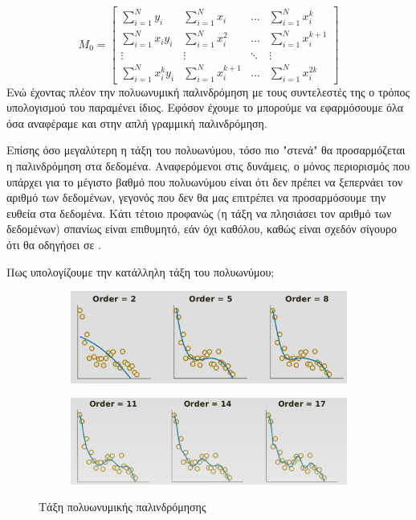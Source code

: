 \\
$$
M_0=
\begin{bmatrix}
    \sum\limits_{i=1}^Ny_i          & \sum\limits_{i=1}^Nx_i        & \dots     & \sum\limits_{i=1}^Nx_i^k \\
    \sum\limits_{i=1}^Nx_iy_i          & \sum\limits_{i=1}^Nx_i^2      & \dots     & \sum\limits_{i=1}^Nx_i^{k+1} \\
    \vdots                          & \vdots                        & \ddots    & \vdots \\
    \sum\limits_{i=1}^Nx_i^ky_i        & \sum\limits_{i=1}^Nx_i^{k+1}  & \dots     & \sum\limits_{i=1}^Nx_i^{2k}
\end{bmatrix}
$$
Ενώ έχοντας πλέον την πολυωνυμική παλινδρόμηση με τους συντελεστές της ο τρόπος
υπολογισμού του  παραμένει ίδιος. Εφόσον έχουμε το  μπορούμε να εφαρμόσουμε
όλα όσα αναφέραμε και στην απλή γραμμική παλινδρόμηση.

Επίσης όσο μεγαλύτερη η τάξη του πολυωνύμου, τόσο πιο "στενά" θα προσαρμόζεται η
παλινδρόμηση στα δεδομένα. Αναφερόμενοι στις δυνάμεις, ο μόνος περιορισμός που
υπάρχει για το μέγιστο βαθμό που πολυωνύμου είναι ότι δεν πρέπει να ξεπερνάει τον αριθμό
των δεδομένων, γεγονός που δεν θα μας επιτρέπει να προσαρμόσουμε την ευθεία στα
δεδομένα. Κάτι τέτοιο προφανώς (η τάξη να πλησιάσει τον αριθμό των δεδομένων) σπανίως
είναι επιθυμητό, εάν όχι καθόλου, καθώς είναι σχεδόν σίγουρο ότι θα οδηγήσει σε .

Πως υπολογίζουμε την κατάλληλη τάξη του πολυωνύμου;


\begin{figure}[H]
    \centering
\begin{subfigure}{1\textwidth}
    \centering
    \includegraphics[width=1\textwidth]{images/Polynomial order 2_1.png}
\end{subfigure}
\begin{subfigure}{1\textwidth}
    \centering
    \includegraphics[width=1\textwidth]{images/Polynomial order 2_2.png}
\end{subfigure}
\caption{Τάξη πολυωνυμικής παλινδρόμησης}
\end{figure}

